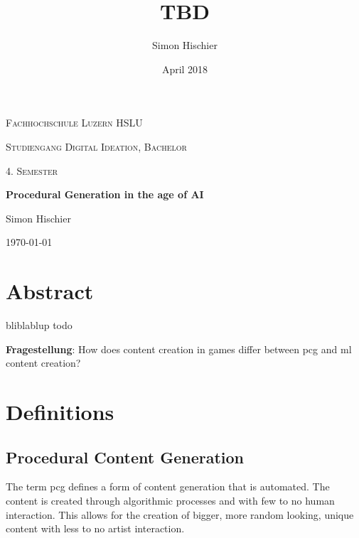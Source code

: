 \documentclass[10pt,a4paper]{article}
\title{TBD}
\author{Simon Hischier}
\date{April 2018}
\begin{document}
\begin{titlepage}
\centering
\vspace{1cm}
	{\scshape\LARGE Fachhochschule Luzern HSLU \par}
	\vspace{1cm}
	{\scshape\Large Studiengang Digital Ideation, Bachelor \par}
	
	{\scshape\Large 4. Semester\par}
	\vspace{1.5cm}
	{\huge\bf Procedural Generation in the age of AI\par}
	
	\vspace{10cm}
	{\Large Simon Hischier\par}
	\vfill

	{\large \today\par}
\end{titlepage}

\renewcommand{\contentsname}{Inhalt}
\tableofcontents
\newpage

\section{Abstract}
bliblablup todo

\textbf{Fragestellung}: How does content creation in games differ between \gls{pcg} and \gls{ml} content creation?

\section{Definitions}
\subsection{Procedural Content Generation}
The term \gls{pcg} defines a form of content generation that is automated. The content is created through algorithmic processes and with few to no human interaction. This allows for the creation of bigger, more random looking, unique content with less to no artist interaction.\cite{VanderLinden2014}
\end{document}
